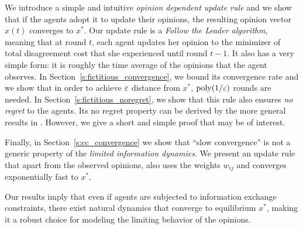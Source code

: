 We introduce a simple and intuitive \emph{opinion dependent update rule} 
and we show that if the agents adopt it to update their opinions, the 
resulting opinion vector $x(t)$ converges to $x^*$. 
Our update rule is a \emph{Follow the Leader algorithm},
meaning that at round $t$, each agent updates her opinion to the minimizer of
total disagreement cost that she experienced until round $t-1$.  It also has a very
simple form: it is roughly the time average of the opinions that the agent
observes.  In Section~\ref{s:fictitious_convergence}, we bound its convergence
rate and we show that in order to achieve $\varepsilon$ distance from $x^*$,
$\mathrm{poly}(1/\varepsilon)$ rounds are needed. In Section~\ref{s:fictitious_noregret}, we
show that this rule also ensures \emph{no regret} to the agents.
Its no regret property can be derived by the more general results in \cite{HAK07}.
However, we give a short and simple proof that may be of interest. 

Finally, in Section~\ref{s:cc_convergence} we show that \enquote{slow convergence}
is not a generic property of the \emph{limited information dynamics}. 
We present an update rule that apart from the observed opinions, also uses the
weights $w_{ij}$ and converges exponentially fast to $x^*$.


Our results imply that even if agents are subjected to information exchange
constraints, there exist natural dynamics that converge to equilibrium $x^*$,
making it a robust choice for modeling the limiting behavior of the opinions.





